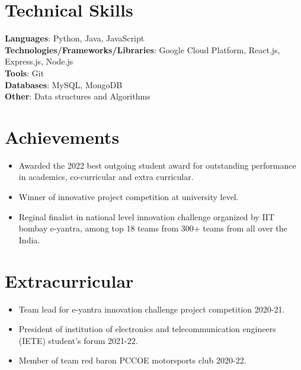 \documentclass[letterpaper,11pt]{article}
\newcommand{\resumeItem}[1]{
  \item\small{
	{#1 \vspace{-2pt}}
  }
}
\newcommand{\resumeItemListStart}{\begin{itemize}}
\newcommand{\resumeItemListEnd}{\end{itemize}\vspace{-5pt}}
\begin{document}
\section{Technical Skills}
 \begin{itemize}[leftmargin=0.15in, label={}]
	\small{\item{
 	\textbf{Languages}{: Python, Java, JavaScript} \\
 	\textbf{Technologies/Frameworks/Libraries}{: Google Cloud Platform, React.js, Express.js, Node.js } \\
 	\textbf{Tools}{: Git} \\
 	\textbf{Databases}{: MySQL, MongoDB} \\
 	\textbf{Other}{: Data structures and Algorithms} \\
	}}
 \end{itemize}
 \vspace{-16pt}

%

\section{Achievements}
 \begin{itemize}[leftmargin=0.15in, label={}]
	\resumeItemListStart
    	\resumeItem{Awarded the 2022 best outgoing student award for outstanding performance in academics, co-curricular and extra curricular.}
    	\resumeItem{Winner of innovative project competition at university level. }
    	\resumeItem{Reginal finalist in national level innovation challenge organized by IIT bombay e-yantra, among top 18 teams from 300+ teams from all over the India. }
  	\resumeItemListEnd
 \end{itemize}
 \vspace{-16pt}

%
 
\section{Extracurricular}
 \begin{itemize}[leftmargin=0.15in, label={}]
	\resumeItemListStart
    	\resumeItem {Team lead for e-yantra innovation challenge project competition 2020-21.}
    	\resumeItem {President of institution of electronics and telecommunication engineers (IETE) student's forum 2021-22.}
    	\resumeItem {Member of team red baron PCCOE motorsports club 2020-22.}
  	\resumeItemListEnd
 \end{itemize}
 \vspace{-16pt}
\end{document}
